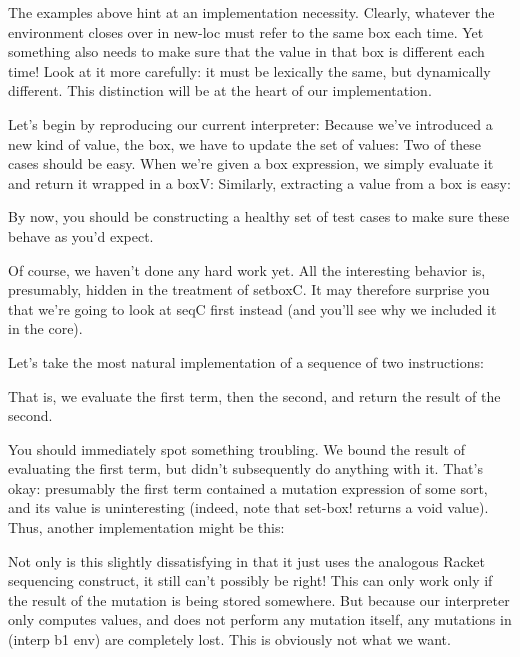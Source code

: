 The examples above hint at an implementation necessity. Clearly, whatever the
environment closes over in new-loc must refer to the same box each time. Yet
something also needs to make sure that the value in that box is different each
time! Look at it more carefully: it must be lexically the same, but dynamically
different. This distinction will be at the heart of our implementation.


Let’s begin by reproducing our current interpreter:
Because we’ve introduced a new kind of value, the box, we have to update the set
of values:
Two of these cases should be easy. When we’re given a box expression, we simply
evaluate it and return it wrapped in a boxV:
Similarly, extracting a value from a box is easy:

By now, you should be constructing a healthy set of test cases to make sure
these behave as you’d expect.

Of course, we haven’t done any hard work yet. All the interesting behavior is,
presumably, hidden in the treatment of setboxC. It may therefore surprise you
that we’re going to look at seqC first instead (and you’ll see why we included
it in the core).

Let’s take the most natural implementation of a sequence of two instructions:

That is, we evaluate the first term, then the second, and return the result of
the second.

You should immediately spot something troubling. We bound the result of
evaluating the first term, but didn’t subsequently do anything with it. That’s
okay: presumably the first term contained a mutation expression of some sort,
and its value is uninteresting (indeed, note that set-box! returns a void
value). Thus, another implementation might be this:

Not only is this slightly dissatisfying in that it just uses the analogous
Racket sequencing construct, it still can’t possibly be right! This can only
work only if the result of the mutation is being stored somewhere. But because
our interpreter only computes values, and does not perform any mutation itself,
any mutations in (interp b1 env) are completely lost. This is obviously not what
we want.


